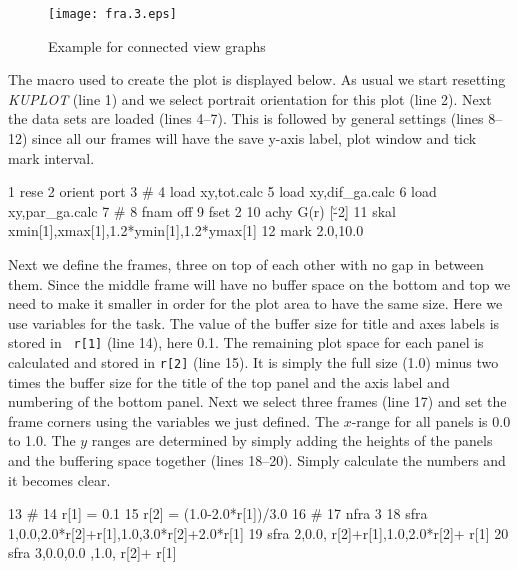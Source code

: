 \begin{figure}[!b]
   \centering
   \texttt{[image: fra.3.eps]}
   \caption{Example for connected view graphs}
   \label{fra-fig3}
\end{figure}

The macro used to create the plot is displayed below. As usual we start
resetting {\it KUPLOT} (line 1) and we select portrait orientation for
this plot (line 2). Next the data sets are loaded (lines 4--7).  This is
followed by general settings (lines 8--12) since all our frames will have
the save y-axis label, plot window and tick mark interval.

\begin{MacVerbatim}
      1  rese
      2  orient port
      3  #
      4  load xy,tot.calc
      5  load xy,dif_ga.calc
      6  load xy,par_ga.calc
      7  #
      8  fnam off
      9  fset 2
     10  achy G(r) [\A\u-2\d]
     11  skal xmin[1],xmax[1],1.2*ymin[1],1.2*ymax[1]
     12  mark 2.0,10.0
\end{MacVerbatim}

Next we define the frames, three on top of each other with no gap in
between them. Since the middle frame will have no buffer space on
the bottom and top we need to make it smaller in order for the plot
area to have the same size. Here we use variables for the task. The
value of the buffer size for title and axes labels is stored in {\tt
r[1]} (line 14), here 0.1. The remaining plot space for each panel
is calculated and stored in {\tt r[2]} (line 15). It is simply the
full size (1.0) minus two times the buffer size for the title of the
top panel and the axis label and numbering of the bottom panel. Next
we select three frames (line 17) and set the frame corners using the
variables we just defined. The $x$-range for all panels is 0.0 to
1.0. The $y$ ranges are determined by simply adding the heights of
the panels and the buffering space together (lines 18--20). Simply
calculate the numbers and it becomes clear.

\begin{MacVerbatim}
     13  #
     14  r[1] = 0.1
     15  r[2] = (1.0-2.0*r[1])/3.0
     16  #
     17  nfra 3
     18  sfra 1,0.0,2.0*r[2]+r[1],1.0,3.0*r[2]+2.0*r[1]
     19  sfra 2,0.0,    r[2]+r[1],1.0,2.0*r[2]+    r[1]
     20  sfra 3,0.0,0.0          ,1.0,    r[2]+    r[1]
\end{MacVerbatim}

